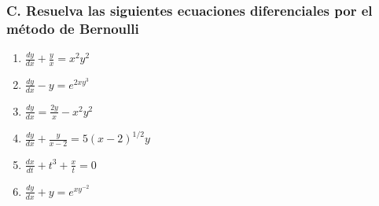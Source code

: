 \documentclass[a4paper,12pt]{article}
\begin{document}
\subsubsection*{C. Resuelva las siguientes ecuaciones diferenciales por el método de Bernoulli}

\begin{enumerate}
    \item \(\frac{dy}{dx} + \frac{y}{x} = x^2 y^2\)
    \item \(\frac{dy}{dx} - y = e^{2x y^3}\)
    \item \(\frac{dy}{dx} = \frac{2y}{x} - x^2 y^2\)
    \item \(\frac{dy}{dx} + \frac{y}{x - 2} = 5(x - 2)^{1/2} y\)
    \item \(\frac{dx}{dt} + t^3 + \frac{x}{t} = 0\)
    \item \(\frac{dy}{dx} + y = e^{x y^{-2}}\)
\end{enumerate}
\end{document}
